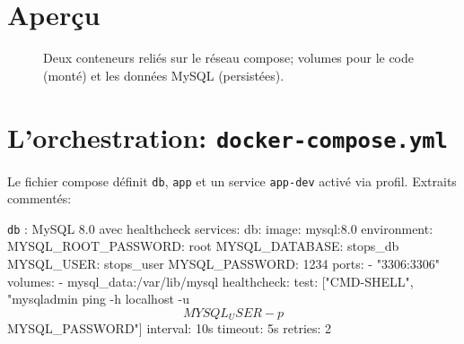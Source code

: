 \section{Aperçu}

\begin{figure}[H]
  \centering
  \caption{Deux conteneurs reliés sur le réseau compose; volumes pour le code (monté) et les données MySQL (persistées).}
\end{figure}

\section{L'orchestration: \texttt{docker-compose.yml}}

Le fichier compose définit \texttt{db}, \texttt{app} et un service \texttt{app-dev} activé via profil. Extraits commentés:

\begin{codebox}{\texttt{db} : MySQL 8.0 avec healthcheck}
services:
  db:
    image: mysql:8.0
    environment:
      MYSQL_ROOT_PASSWORD: root
      MYSQL_DATABASE: stops_db
      MYSQL_USER: stops_user
      MYSQL_PASSWORD: 1234
    ports:
      - "3306:3306"
    volumes:
      - mysql_data:/var/lib/mysql
    healthcheck:
      test: ["CMD-SHELL", "mysqladmin ping -h localhost -u$${MYSQL_USER} -p$${MYSQL_PASSWORD}"]
      interval: 10s
      timeout: 5s
      retries: 2
\end{codebox}

